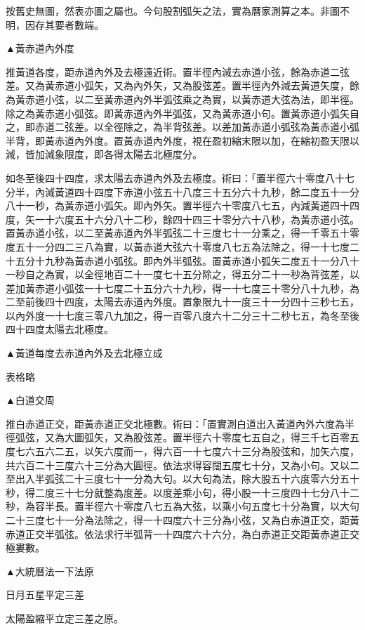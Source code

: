 按舊史無圖，然表亦圖之屬也。今句股割弧矢之法，實為曆家測算之本。非圖不明，因存其要者數端。

▲黃赤道內外度

推黃道各度，距赤道內外及去極遠近術。置半徑內減去赤道小弦，餘為赤道二弦差。又為黃赤道小弧矢，又為內外矢，又為股弦差。置半徑內外減去黃道矢度，餘為黃赤道小弦，以二至黃赤道內外半弧弦乘之為實，以黃赤道大弦為法，即半徑。除之為黃赤道小弧弦。即黃赤道內外半弧弦，又為黃赤道小句。置黃赤道小弧矢自之，即赤道二弦差。以全徑除之，為半背弦差。以差加黃赤道小弧弦為黃赤道小弧半背，即黃赤道內外度。置黃赤道內外度，視在盈初縮末限以加，在縮初盈天限以減，皆加減象限度，即各得太陽去北極度分。

如冬至後四十四度，求太陽去赤道內外及去極度。術曰：「置半徑六十零度八十七分半，內減黃道四十四度下赤道小弦五十八度三十五分六十九秒，餘二度五十一分八十一秒，為黃赤道小弧矢。即內外矢。置半徑六十零度八七五，內減黃道四十四度，矢一十六度五十六分八十二秒，餘四十四三十零分六十八秒，為黃赤道小弦。置黃赤道小弦，以二至黃赤道內外半弧弦二十三度七十一分乘之，得一千零五十零度五十一分四二三八為實，以黃赤道大弦六十零度八七五為法除之，得一十七度二十五分十九秒為黃赤道小弧弦。即內外半弧弦。置黃赤道小弧矢二度五十一分八十一秒自之為實，以全徑地百二十一度七十五分除之，得五分二十一秒為背弦差，以差加黃赤道小弧弦一十七度二十五分六十九秒，得一十七度三十零分八十九秒，為二至前後四十四度，太陽去赤道內外度。置象限九十一度三十一分四十三秒七五，以內外度一十七度三零八九加之，得一百零八度六十二分三十二秒七五，為冬至後四十四度太陽去北極度。

▲黃道每度去赤道內外及去北極立成

表格略

▲白道交周

推白赤道正交，距黃赤道正交北極數。術曰：「置實測白道出入黃道內外六度為半徑弧弦，又為大圖弧矢，又為股弦差。置半徑六十零度七五自之，得三千七百零五度七六五六二五，以矢六度而一，得六百一十七度六十三分為股弦和，加矢六度，共六百二十三度六十三分為大圓徑。依法求得容闊五度七十分，又為小句。又以二至出入半弧弦二十三度七十一分為大句。以大句為法，除大股五十六度零六分五十秒，得二度三十七分就整為度差。以度差乘小句，得小股一十三度四十七分八十二秒，為容半長。置半徑六十零度八七五為大弦，以乘小句五度七十分為實，以大句二十三度七十一分為法除之，得一十四度六十三分為小弦，又為白赤道正交，距黃赤道正交半弧弦。依法求行半弧背一十四度六十六分，為白赤道正交距黃赤道正交極婁數。

▲大統曆法一下法原

日月五星平定三差

太陽盈縮平立定三差之原。

